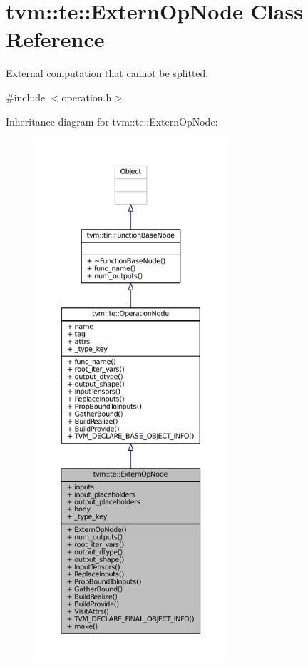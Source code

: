 \hypertarget{classtvm_1_1te_1_1ExternOpNode}{}\section{tvm\+:\+:te\+:\+:Extern\+Op\+Node Class Reference}
\label{classtvm_1_1te_1_1ExternOpNode}


External computation that cannot be splitted.  




{\ttfamily \#include $<$operation.\+h$>$}



Inheritance diagram for tvm\+:\+:te\+:\+:Extern\+Op\+Node\+:
\nopagebreak
\begin{figure}[H]
\begin{center}
\leavevmode
\includegraphics[height=550pt]{classtvm_1_1te_1_1ExternOpNode__inherit__graph}
\end{center}
\end{figure}


